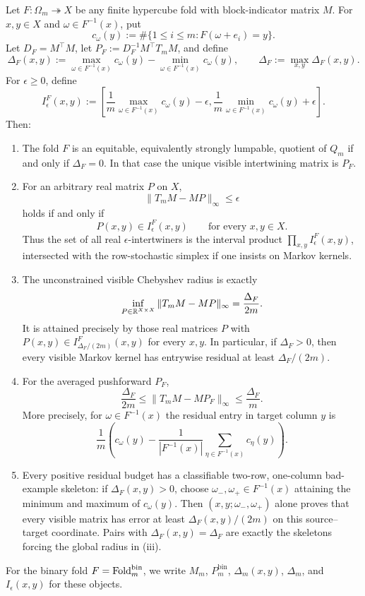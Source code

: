 \begin{theorem}\label{thm:foldbin-complete-residual-budget-skeleton}
Let \(F:\Omega_m\twoheadrightarrow X\) be any finite hypercube fold with block-indicator matrix \(M\).  For \(x,y\in X\) and \(\omega\in F^{-1}(x)\), put
\[
c_\omega(y):=\#\{1\le i\le m:F(\omega+e_i)=y\}.
\]
Let \(D_F=M^\top M\), let \(P_F:=D_F^{-1}M^\top T_mM\), and define
\[
\Delta_F(x,y):=\max_{\omega\in F^{-1}(x)} c_\omega(y)
-
\min_{\omega\in F^{-1}(x)} c_\omega(y),
\qquad
\Delta_F:=\max_{x,y}\Delta_F(x,y).
\]
For \(\epsilon\ge0\), define
\[
I_\epsilon^F(x,y):=
\left[
\frac{1}{m}\max_{\omega\in F^{-1}(x)}c_\omega(y)-\epsilon,
\frac{1}{m}\min_{\omega\in F^{-1}(x)}c_\omega(y)+\epsilon
\right].
\]
Then:
\begin{enumerate}[label=\textup{(\roman*)}]
\item The fold \(F\) is an equitable, equivalently strongly lumpable, quotient of \(Q_m\) if and only if \(\Delta_F=0\).  In that case the unique visible intertwining matrix is \(P_F\).
\item For an arbitrary real matrix \(P\) on \(X\),
\[
\|T_mM-MP\|_\infty\le\epsilon
\]
holds if and only if
\[
P(x,y)\in I_\epsilon^F(x,y)
\qquad\text{for every }x,y\in X.
\]
Thus the set of all real \(\epsilon\)-intertwiners is the interval product \(\prod_{x,y}I_\epsilon^F(x,y)\), intersected with the row-stochastic simplex if one insists on Markov kernels.
\item The unconstrained visible Chebyshev radius is exactly
\[
\inf_{P\in\mathbb{R}^{X\times X}}
\|T_mM-MP\|_\infty
=\frac{\Delta_F}{2m}.
\]
It is attained precisely by those real matrices \(P\) with \(P(x,y)\in I_{\Delta_F/(2m)}^F(x,y)\) for every \(x,y\).  In particular, if \(\Delta_F>0\), then every visible Markov kernel has entrywise residual at least \(\Delta_F/(2m)\).
\item For the averaged pushforward \(P_F\),
\[
\frac{\Delta_F}{2m}\le
\|T_mM-MP_F\|_\infty
\le \frac{\Delta_F}{m}.
\]
More precisely, for \(\omega\in F^{-1}(x)\) the residual entry in target column \(y\) is
\[
\frac{1}{m}\left(c_\omega(y)-\frac{1}{|F^{-1}(x)|}
\sum_{\eta\in F^{-1}(x)}c_\eta(y)\right).
\]
\item Every positive residual budget has a classifiable two-row, one-column bad-example skeleton: if \(\Delta_F(x,y)>0\), choose \(\omega_-,\omega_+\in F^{-1}(x)\) attaining the minimum and maximum of \(c_\omega(y)\).  Then \((x,y;\omega_-,\omega_+)\) alone proves that every visible matrix has error at least \(\Delta_F(x,y)/(2m)\) on this source--target coordinate.  Pairs with \(\Delta_F(x,y)=\Delta_F\) are exactly the skeletons forcing the global radius in \textup{(iii)}.
\end{enumerate}
For the binary fold \(F=\operatorname{Fold}_m^{\mathrm{bin}}\), we write \(M_m\), \(P_m^{\mathrm{bin}}\), \(\Delta_m(x,y)\), \(\Delta_m\), and \(I_\epsilon(x,y)\) for these objects.
\end{theorem}

